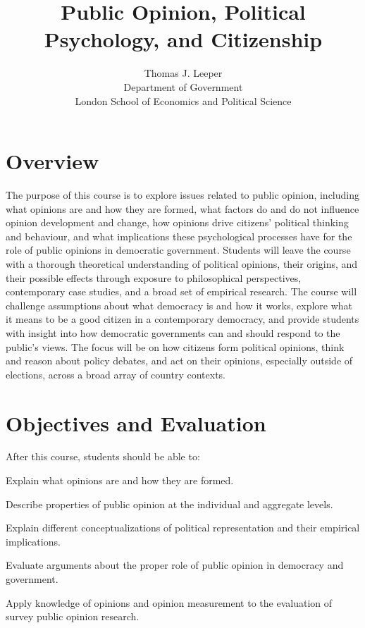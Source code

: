 \documentclass[12pt,a4paper]{article}
\title{Public Opinion, Political Psychology, and Citizenship}
\author{Thomas J. Leeper\\
Department of Government\\
London School of Economics and Political Science}
\begin{document}
\nobibliography*

\maketitle

\faketableofcontents

\section{Overview}

The purpose of this course is to explore issues related to public opinion, including what opinions are and how they are formed, what factors do and do not influence opinion development and change, how opinions drive citizens' political thinking and behaviour, and what implications these psychological processes have for the role of public opinions in democratic government. Students will leave the course with a thorough theoretical understanding of political opinions, their origins, and their possible effects through exposure to philosophical perspectives, contemporary case studies, and a broad set of empirical research. The course will challenge assumptions about what democracy is and how it works, explore what it means to be a good citizen in a contemporary democracy, and provide students with insight into how democratic governments can and should respond to the public's views. The focus will be on how citizens form political opinions, think and reason about policy debates, and act on their opinions, especially outside of elections, across a broad array of country contexts.

\section{Objectives and Evaluation}
After this course, students should be able to:
\begin{enumerate*}
\item Explain what opinions are and how they are formed.
\item Describe properties of public opinion at the individual and aggregate levels.
\item Explain different conceptualizations of political representation and their empirical implications.
\item Evaluate arguments about the proper role of public opinion in democracy and government.
\item Apply knowledge of opinions and opinion measurement to the evaluation of survey public opinion research.
\end{enumerate*}
\end{document}
